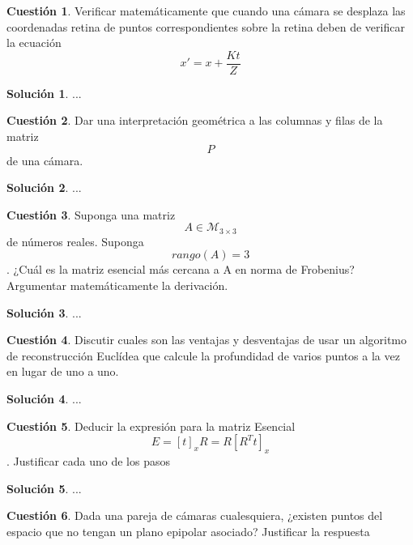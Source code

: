 \documentclass[a4paper, 11pt]{article}
\theoremstyle{definition}
\newtheorem{cuestion}{Cuestión}
\newtheorem*{solucion}{Solución}
\begin{document}
  \begin{cuestion}
    Verificar matemáticamente que cuando una cámara se desplaza las coordenadas retina de
puntos correspondientes sobre la retina deben de verificar la ecuación $$ x' = x + \frac{Kt}{Z} $$

  \end{cuestion}

  \begin{solucion}
      ...
  \end{solucion}

  \begin{cuestion}
    Dar una interpretación geométrica a las columnas y filas de la matriz $$P$$ de una cámara.

  \end{cuestion}

  \begin{solucion}
    ...
  \end{solucion}

  \begin{cuestion}
    Suponga una matriz $$ A \in \mathcal{M}_{3\times3}$$ de números reales.
    Suponga $$rango(A)=3$$. ¿Cuál es la matriz esencial más cercana a A en norma de Frobenius?
    Argumentar matemáticamente la derivación.
  \end{cuestion}

  \begin{solucion}
    ...
  \end{solucion}

  \begin{cuestion}
    Discutir cuales son las ventajas y desventajas de usar un algoritmo de reconstrucción
    Euclídea que calcule la profundidad de varios puntos a la vez en lugar de uno a uno.

  \end{cuestion}

  \begin{solucion}
      ...
  \end{solucion}

  \begin{cuestion}
    Deducir la expresión para la matriz Esencial $$E = [t]_x R = R[R^Tt]_x$$.
    Justificar cada uno de los pasos

  \end{cuestion}

  \begin{solucion}
    ...
  \end{solucion}

  \begin{cuestion}
    Dada una pareja de cámaras cualesquiera, ¿existen puntos del espacio que no tengan un
    plano epipolar asociado? Justificar la respuesta
  \end{cuestion}
\end{document}
